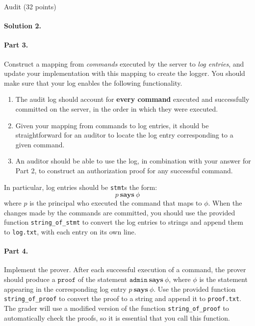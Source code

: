 \documentclass[11pt]{article}
\newcommand{\says}{\ensuremath{\mathbf{says}}\xspace}
\begin{document}
\begin{problem}{Audit (32 points)}
\paragraph{Solution 2.}

\paragraph{Part 3. } Construct a mapping from \emph{commands} executed by the server to \emph{log entries}, and update your implementation with this mapping to create the logger. You should make sure that your log enables the following functionality.
\begin{enumerate}
\item The audit log should account for \textbf{every command} executed and successfully committed on the server, in the order in which they were executed.
\item Given your mapping from commands to log entries, it should be straightforward for an auditor to locate the log entry corresponding to a given command.
\item An auditor should be able to use the log, in combination with your answer for Part 2, to construct an authorization proof for any successful command.
\end{enumerate}
In particular, log entries should be \texttt{stmt}s the form:
\[
p\ \says\ \phi
\]
where $p$ is the principal who executed the command that maps to $\phi$. When the changes made by the commands are committed, you should use the provided function \texttt{string\_of\_stmt} to convert the log entries to strings and append them to \texttt{log.txt}, with each entry on its own line.

\paragraph{Part 4. } Implement the prover. After each successful execution of a command, the prover should produce a $\mathtt{proof}$ of the statement $\mathtt{admin}\ \says\ \phi$, where $\phi$ is the statement appearing in the corresponding log entry $p\ \says\ \phi$. Use the provided function \texttt{string\_of\_proof} to convert the proof to a string and append it to \texttt{proof.txt}. The grader will use a modified version of the function \texttt{string\_of\_proof} to automatically check the proofs, so it is essential that you call this function.
\end{problem}
\end{document}
